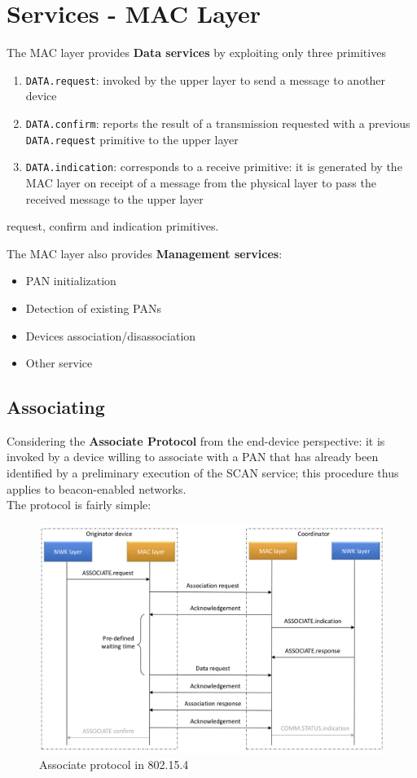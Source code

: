 \section{Services - MAC Layer}

The MAC layer provides \textbf{Data services} by exploiting only three primitives
\begin{enumerate} 
   \item \texttt{DATA.request}: invoked by the upper layer to send a message to another device  
   \item \texttt{DATA.confirm}: reports the result of a transmission requested with a previous \texttt{DATA.request} primitive to the upper layer 
   \item \texttt{DATA.indication}: corresponds to a receive primitive: it is generated by the MAC layer on receipt of a message from the physical layer to pass the received message to the upper layer
\end{enumerate} request, confirm and indication primitives.
\nl

The MAC layer also provides \textbf{Management services}:
\begin{itemize}
   \item PAN initialization
   \item Detection of existing PANs
   \item Devices association/disassociation
   \item Other service
\end{itemize}


\subsection{Associating}
Considering the \textbf{Associate Protocol} from the end-device perspective:
it is invoked by a device willing to associate with a PAN that has already been identified by a preliminary execution of the SCAN service; this procedure thus applies to beacon-enabled networks.\\
The protocol is fairly simple:

\begin{figure}[htbp]
   \centering
   \includegraphics{images/802_associate.png}
   \caption{Associate protocol in 802.15.4}
   \label{fig:802_associate}
\end{figure}

